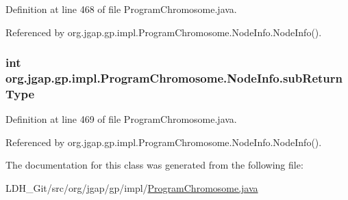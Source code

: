 Definition at line 468 of file Program\-Chromosome.\-java.



Referenced by org.\-jgap.\-gp.\-impl.\-Program\-Chromosome.\-Node\-Info.\-Node\-Info().

\hypertarget{classorg_1_1jgap_1_1gp_1_1impl_1_1_program_chromosome_1_1_node_info_ae3601654472ce3b9c0aff093608aaeee}{
\subsubsection[{sub\-Return\-Type}]{\setlength{\rightskip}{0pt plus 5cm}int org.\-jgap.\-gp.\-impl.\-Program\-Chromosome.\-Node\-Info.\-sub\-Return\-Type}}\label{classorg_1_1jgap_1_1gp_1_1impl_1_1_program_chromosome_1_1_node_info_ae3601654472ce3b9c0aff093608aaeee}


Definition at line 469 of file Program\-Chromosome.\-java.



Referenced by org.\-jgap.\-gp.\-impl.\-Program\-Chromosome.\-Node\-Info.\-Node\-Info().



The documentation for this class was generated from the following file\-:\begin{DoxyCompactItemize}
\item 
L\-D\-H\-\_\-\-Git/src/org/jgap/gp/impl/\hyperlink{_program_chromosome_8java}{Program\-Chromosome.\-java}\end{DoxyCompactItemize}
